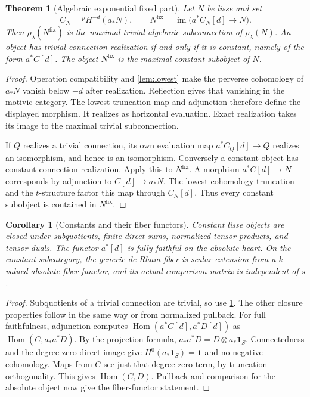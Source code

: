 \documentclass[11pt]{article}
\numberwithin{equation}{section}
\newtheorem{theorem}{Theorem}[section]
\newtheorem{corollary}[corollary]{Corollary}
\theoremstyle{definition}
\theoremstyle{remark}
\newcommand{\im}{\operatorname{im}}
\newcommand{\Hom}{\operatorname{Hom}}
\newcommand{\fix}{\mathrm{fix}}
\newcommand{\pH}{{}^{p}\!H}
\newcommand{\one}{\mathbf1}
\begin{document}
\begin{theorem}[Algebraic exponential fixed part]\label{thm:fixed}
Let $N$ be lisse and set
\[
 C_N=\pH^{-d}(a_*N),\qquad
 N^{\fix}=\im\bigl(a^*C_N[d]\longrightarrow N\bigr).
\]
Then $\rho_\lambda(N^{\fix})$ is the maximal trivial algebraic
subconnection of $\rho_\lambda(N)$. An object has trivial connection
realization if and only if it is constant, namely of the form $a^*C[d]$.
The object $N^{\fix}$ is the maximal constant subobject of $N$.
\end{theorem}
\begin{proof}
Operation compatibility and \cref{lem:lowest} make the perverse cohomology
of $a_*N$ vanish below $-d$ after realization. Reflection gives that
vanishing in the motivic category. The lowest truncation map and adjunction
therefore define the displayed morphism. It realizes as horizontal
evaluation. Exact realization takes its image to the maximal trivial
subconnection.

If $Q$ realizes a trivial connection, its own evaluation map
$a^*C_Q[d]\to Q$ realizes an isomorphism, and hence is an isomorphism.
Conversely a constant object has constant connection realization. Apply
this to $N^{\fix}$. A morphism $a^*C[d]\to N$ corresponds by adjunction
to $C[d]\to a_*N$. The lowest-cohomology truncation and the $t$-structure
factor this map through $C_N[d]$. Thus every constant subobject is
contained in $N^{\fix}$.
\end{proof}

\begin{corollary}[Constants and their fiber functors]\label{cor:constants}
Constant lisse objects are closed under subquotients, finite direct sums,
normalized tensor products, and tensor duals. The functor $a^*[d]$ is
fully faithful on the absolute heart. On the constant subcategory, the
generic de Rham fiber is scalar extension from a $k$-valued absolute
fiber functor, and its actual comparison matrix is independent of $s$.
\end{corollary}
\begin{proof}
Subquotients of a trivial connection are trivial, so use
\cref{thm:fixed}. The other closure properties follow in the same way or
from normalized pullback. For full faithfulness, adjunction computes
$\Hom(a^*C[d],a^*D[d])$ as $\Hom(C,a_*a^*D)$. By the projection formula,
$a_*a^*D=D\otimes a_*\one_S$. Connectedness and the degree-zero direct
image give $H^0(a_*\one_S)=\one$ and no negative cohomology. Maps from
$C$ see just that degree-zero term, by truncation orthogonality. This gives
$\Hom(C,D)$. Pullback and comparison for the absolute object now give
the fiber-functor statement.
\end{proof}
\end{document}
